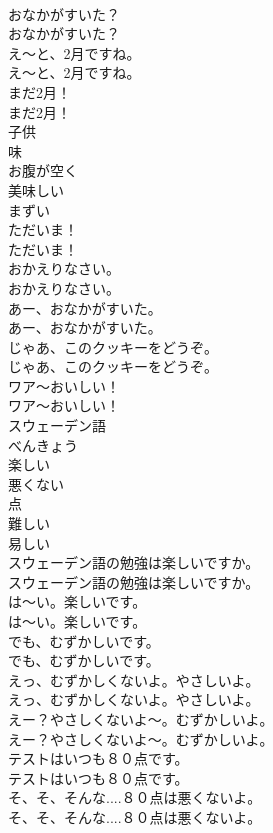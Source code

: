 \documentclass[8pt]{extreport}
\begin{document}
\begin{CJK}{UTF8}{min}
\\	おなかがすいた？	
\\	おなかがすいた？ 
\\	え～と、2月ですね。	
\\	え～と、2月ですね。 
\\	まだ2月！	
\\	まだ2月！ 
\\	子供
\\	味
\\	お腹が空く
\\	美味しい
\\	まずい
\\	ただいま！	
\\	ただいま！ 
\\	おかえりなさい。	
\\	おかえりなさい。 
\\	あー、おなかがすいた。	
\\	あー、おなかがすいた。 
\\	じゃあ、このクッキーをどうぞ。	
\\	じゃあ、このクッキーをどうぞ。 
\\	ワア〜おいしい！	
\\	ワア〜おいしい！ 
\\	スウェーデン語
\\	べんきょう
\\	楽しい
\\	悪くない
\\	点
\\	難しい
\\	易しい
\\	スウェーデン語の勉強は楽しいですか。	
\\	スウェーデン語の勉強は楽しいですか。 
\\	は〜い。楽しいです。	
\\	は〜い。楽しいです。 
\\	でも、むずかしいです。	
\\	でも、むずかしいです。 
\\	えっ、むずかしくないよ。やさしいよ。	
\\	えっ、むずかしくないよ。やさしいよ。 
\\	えー？やさしくないよ〜。むずかしいよ。	
\\	えー？やさしくないよ〜。むずかしいよ。 
\\	テストはいつも８０点です。	
\\	テストはいつも８０点です。 
\\	そ、そ、そんな....８０点は悪くないよ。	
\\	そ、そ、そんな....８０点は悪くないよ。 

\end{CJK}
\end{document}
